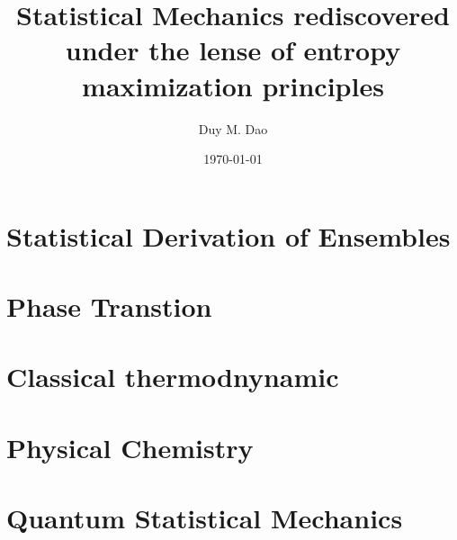 \documentclass[11pt]{article}      %
\title{Statistical Mechanics rediscovered under the lense of entropy maximization principles}
\author{Duy M. Dao}
\date{\today}                      %
\numberwithin{equation}{section}   %
\begin{document}
\maketitle                         %
\tableofcontents                   %

\newpage
\part{Statistical Derivation of Ensembles}
    
    
    
    
\part{Phase Transtion}
    
    
\part{Classical thermodnynamic}

\part{Physical Chemistry}

\part{Quantum Statistical Mechanics}
\end{document}
